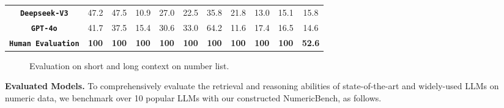 \begin{table*}[t]
\begin{tabular}{c|ccc|ccc|ccc|c}
				\textbf{\texttt{Deepseek-V3}}& \multicolumn{1}{c}{47.2}                  & \multicolumn{1}{c}{47.5}               &       10.9          & \multicolumn{1}{c}{27.0}                  & \multicolumn{1}{c}{22.5}               &       35.8          & \multicolumn{1}{c}{21.8}                  & \multicolumn{1}{c}{13.0}               &       15.1          &   15.8                \\  
		
		\textbf{\texttt{GPT-4o}}& \multicolumn{1}{c}{41.7}                  & \multicolumn{1}{c}{37.5}               &        15.4          & \multicolumn{1}{c}{30.6}                  & \multicolumn{1}{c}{33.0}               &       64.2           & \multicolumn{1}{c}{11.6}                  & \multicolumn{1}{c}{17.4}               &      16.5            &        14.6           \\ 
		

		
		\midrule
		
		\textbf{\texttt{Human Evaluation}}& \multicolumn{1}{c}{\textbf{100}}                  &  \multicolumn{1}{c}{\textbf{100}}               &      \textbf{100}            & \multicolumn{1}{c}{\textbf{100}}                  & \multicolumn{1}{c}{\textbf{100}}               &        \textbf{100}          & \multicolumn{1}{c}{\textbf{100}}                  & \multicolumn{1}{c}{\textbf{100}}               &          \textbf{100}        &               \textbf{52.6}   \\ \bottomrule
	\end{tabular}
	\label{tab:main_experiments}
\end{table*}
\begin{figure*}[t]
		\vspace{-1em}
	\centering 	
	\hfill
	\hfill
	\caption{Evaluation on short and long context on number list.}
	\label{fig:length_number}
	
\end{figure*}
\noindent\textbf{Evaluated Models.}
To comprehensively evaluate the retrieval and reasoning abilities of state-of-the-art and widely-used LLMs on numeric data, 
we benchmark over 10 popular LLMs with our constructed NumericBench, as follows.
